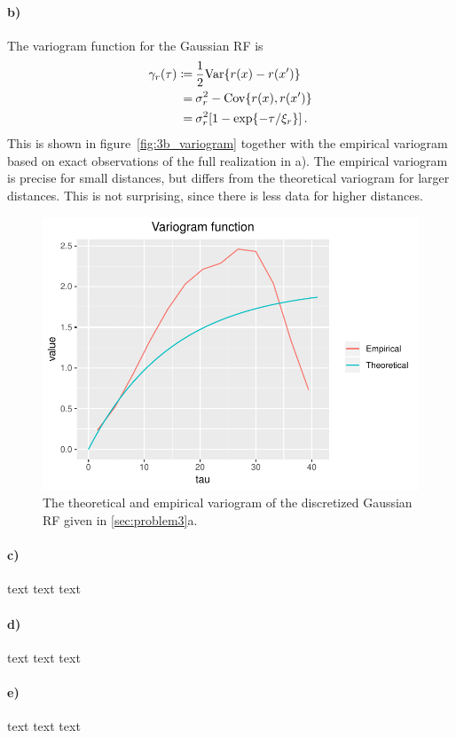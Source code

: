 \paragraph{b)}
The variogram function for the Gaussian RF is
%
\begin{align*}
\gamma_r(\tau)
\coloneqq&\: \frac{1}{2} \mathrm{Var} \{ r(x) - r(x') \} \\
=&\: \sigma_r^2 - \mathrm{Cov}\{r(x), r(x')\} \\
=&\: \sigma_r^2 [1 - \exp\{-\tau/\xi_r\}] \, .
\end{align*}
%
This is shown in figure~\ref{fig:3b_variogram} together with the empirical variogram based on exact observations of the full realization in a). The empirical variogram is precise for small distances, but differs from the theoretical variogram for larger distances. This is not surprising, since there is less data for higher distances.

\begin{figure}
    \centering
    \includegraphics[scale=0.95]{figures/3b_variogram.pdf}
    \caption{The theoretical and empirical variogram of the discretized Gaussian RF given in \ref{sec:problem3}a.}
    \label{fig:3a_realization}
\end{figure}

\paragraph{c)}
text text text

\paragraph{d)}
text text text

\paragraph{e)}
text text text
